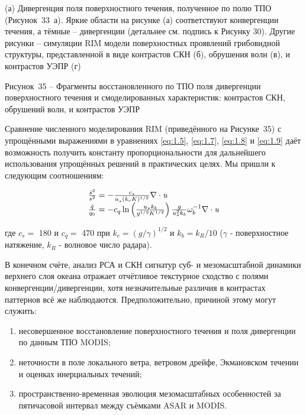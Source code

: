 (а) Дивергенция поля поверхностного течения, полученное по полю ТПО (Рисунок~33~а). Яркие области на рисунке (а) соответствуют конвергенции течения, а тёмные -- дивергенции (детальнее см. подпись к Рисунку 30). Другие рисунки -- симуляции RIM модели поверхностных проявлений грибовидной структуры, представленной в виде контрастов СКН (б), обрушения волн (в), и контрастов УЭПР (г)



Рисунок~35 -- Фрагменты восстановленного по ТПО поля дивергенции поверхностного течения и смоделированных характеристик: контрастов СКН, обрушений волн, и контрастов УЭПР



Сравнение численного моделирования RIM (приведённого на Рисунке~35) с упрощёнными выражениями в уравнениях \eqref{eq:1.5}, \eqref{eq:1.7}, \eqref{eq:1.8} и \eqref{eq:1.9} даёт возможность получить константу пропорциональности для дальнейшего использования упрощённых решений в практических целях. Мы пришли к следующим соотношениям:



\begin{equation} \label{eq:3.11)} \begin{array}{l} {\frac{\tilde{s}^{2} }{s^{2} } =-\frac{c_{s} }{u_{*}^{} (k_{c} K)^{1/2} } \nabla \cdot {\it u}} \\ {\frac{\tilde{q}_{} }{q_{0} } =-c_{q} \ln \left(\frac{u_{*} k_{b} }{g^{1/2} K^{1/2} } \right)\frac{g}{u_{*}^{2} k_{b} } \omega _{b}^{-1} \nabla \cdot {\it u}} \end{array} \end{equation} 



\noindent где $c_{s} =$ 180 и $c_{q} =$ 470 при $k_{c} =(g/\gamma )^{1/2} $ и $k_{b} =k_{R} /10$ ($\gamma $ - поверхностное натяжение, $k_{R} $ - волновое число радара).

В конечном счёте, анализ РСА и СКН сигнатур суб- и мезомасштабной динамики верхнего слоя океана отражает отчётливое текстурное сходство с полями конвергенции/дивергенции, хотя незначительные различия в контрастах паттернов всё же наблюдаются. Предположительно, причиной этому могут служить:

\begin{enumerate}
\item  несовершенное восстановление поверхностного течения и поля дивергенции по данным ТПО MODIS;

\item  неточности в поле локального ветра, ветровом дрейфе, Экмановском течении и оценках инерциальных течений;

\item  пространственно-временная эволюция мезомасштабных особенностей за пятичасовой интервал между съёмками ASAR и MODIS.
\end{enumerate}

